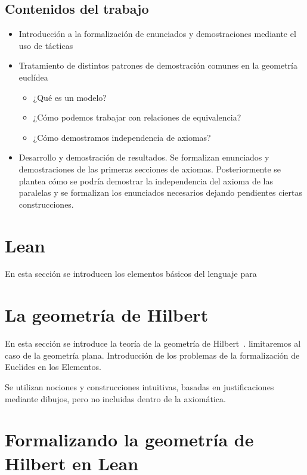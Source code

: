 \documentclass[12pt, spanish]{TFG}
\begin{document}
\subsection{Contenidos del trabajo}

\begin{itemize}

    \item Introducción a la formalización de enunciados y demostraciones
        mediante el uso de tácticas

    \item Tratamiento de distintos patrones de demostración comunes en la
        geometría euclídea
        \begin{itemize}
            \item ¿Qué es un modelo?
            \item ¿Cómo podemos trabajar con relaciones de equivalencia?
            \item ¿Cómo demostramos independencia de axiomas?
        \end{itemize}

    \item Desarrollo y demostración de resultados. Se formalizan enunciados y
        demostraciones de las primeras secciones de axiomas. Posteriormente se
        plantea cómo se podría demostrar la independencia del axioma de las
        paralelas y se formalizan los enunciados necesarios dejando pendientes
        ciertas construcciones.

\end{itemize}

\newpage
\section{Lean}

En esta sección se introducen los elementos básicos del lenguaje para


\newpage
\section{La geometría de Hilbert}

En esta sección se introduce la teoría de la geometría de
Hilbert~\cite{hilbert1902grundlagenfoundations}.
limitaremos al caso de la geometría plana. Introducción de los problemas de la
formalización de Euclides en los Elementos.

Se utilizan nociones y construcciones intuitivas, basadas en justificaciones
mediante dibujos, pero no incluidas dentro de la axiomática.


\newpage
\section{Formalizando la geometría de Hilbert en Lean}

\newpage
{}

\end{document}
